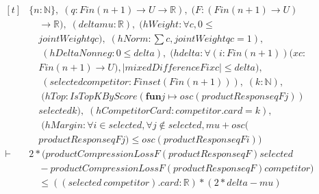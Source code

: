 \documentclass[conference]{IEEEtran}
\theoremstyle{definition}
\begin{document}
{\footnotesize\[ \begin{aligned}[t]
&\{ \mathit{n} : \mathbb{N} \},\; (\mathit{q} : \mathit{Fin} (\mathit{n} + 1) \to \mathit{U} \to \mathbb{R} ),\; (\mathit{F} : (\mathit{Fin} (\mathit{n} + 1) \to \mathit{U})\\
&\quad \to \mathbb{R} ),\; (\mathit{delta} \mathit{mu} : \mathbb{R} ),\; (\mathit{hWeight} : \forall \mathit{c}, 0 \leq\\
&\quad \mathit{jointWeight} \mathit{q} \mathit{c}),\; (\mathit{hNorm} : \textstyle\sum \mathit{c}, \mathit{jointWeight} \mathit{q} \mathit{c} = 1),\\
&\quad \; (\mathit{hDeltaNonneg} : 0 \leq \mathit{delta}),\; (\mathit{hdelta} : \forall (\mathit{i} : \mathit{Fin} (\mathit{n} + 1)) (\mathit{x} \mathit{c} :\\
&\quad \mathit{Fin} (\mathit{n} + 1) \to \mathit{U}), |\mathit{mixedDifference} \mathit{F} \mathit{i} \mathit{x} \mathit{c}| \leq \mathit{delta}),\\
&\quad \; (\mathit{selected} \mathit{competitor} : \mathit{Finset} (\mathit{Fin} (\mathit{n} + 1))),\; (\mathit{k} : \mathbb{N} ),\\
&\quad \; (\mathit{hTop} : \mathit{IsTopKByScore} (\mathbf{fun} \mathit{j} \mapsto \mathit{osc} (\mathit{productResponse} \mathit{q} \mathit{F} \mathit{j}))\\
&\quad \mathit{selected} \mathit{k}),\; (\mathit{hCompetitorCard} : \mathit{competitor}.\mathit{card} = \mathit{k}),\\
&\quad \; (\mathit{hMargin} : \forall \mathit{i} \in \mathit{selected}, \forall \mathit{j} \notin \mathit{selected}, \mathit{mu} + \mathit{osc} (\\
&\quad \mathit{productResponse} \mathit{q} \mathit{F} \mathit{j}) \leq \mathit{osc} (\mathit{productResponse} \mathit{q} \mathit{F} \mathit{i}))\\
\vdash\;&2 * (\mathit{productCompressionLoss} \mathit{F} (\mathit{productResponse} \mathit{q} \mathit{F}) \mathit{selected}\\
&\quad - \mathit{productCompressionLoss} \mathit{F} (\mathit{productResponse} \mathit{q} \mathit{F}) \mathit{competitor})\\
&\quad \leq ((\mathit{selected} \ \mathit{competitor}).\mathit{card} : \mathbb{R} ) * (2 * \mathit{delta} - \mathit{mu})
\end{aligned} \]}
\end{document}
